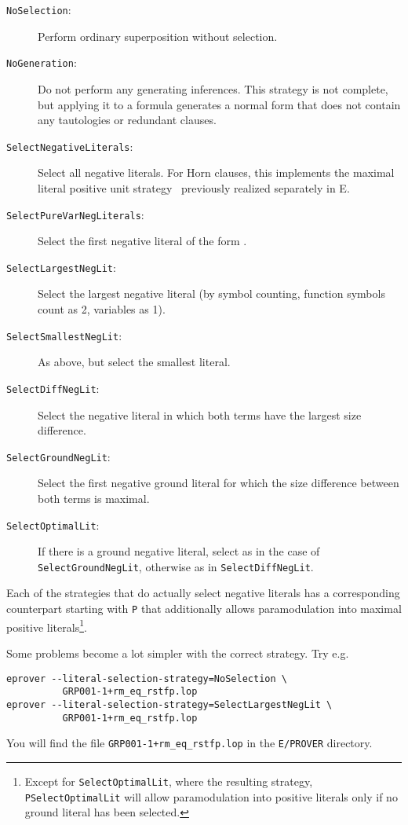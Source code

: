 \documentclass{article}
\begin{document}
\begin{description}
\item[\texttt{NoSelection}:]
 Perform ordinary superposition without selection.
\item[\texttt{NoGeneration}:] Do not perform any generating
  inferences. This strategy is not complete, but applying it to a
  formula generates a normal form that does not contain any
  tautologies or redundant clauses.
\item[\texttt{SelectNegativeLiterals}:] Select all negative literals. For Horn
  clauses, this implements the maximal literal positive unit
  strategy~\cite{Dershowitz:IJCAI-91} previously realized separately in
  E.
\item[\texttt{SelectPureVarNegLiterals}:] Select the first negative literal of
  the form .
\item[\texttt{SelectLargestNegLit}:] Select the largest negative literal (by
  symbol counting, function symbols count as 2, variables as 1).
\item[\texttt{SelectSmallestNegLit}:] As above, but select the smallest
  literal.
\item[\texttt{SelectDiffNegLit}:] Select the negative literal in which both
  terms have the largest size difference.
\item[\texttt{SelectGroundNegLit}:] Select the first negative ground literal
  for which the size difference between both terms is maximal.
\item[\texttt{SelectOptimalLit}:] If there is a ground negative literal, select
  as in the case of \texttt{SelectGroundNegLit}, otherwise as in
  \texttt{SelectDiffNegLit}.
\end{description}

Each of the strategies that do actually select negative literals has a
corresponding counterpart starting with \texttt{P} that additionally
allows paramodulation into maximal positive literals\footnote{Except
  for \texttt{SelectOptimalLit}, where the resulting strategy,
  \texttt{PSelectOptimalLit} will allow paramodulation into positive
  literals only if no ground literal has been selected.}.


\begin{example}
  Some problems become a lot simpler with the correct
  strategy. Try e.g.
\begin{verbatim}
eprover --literal-selection-strategy=NoSelection \
          GRP001-1+rm_eq_rstfp.lop
eprover --literal-selection-strategy=SelectLargestNegLit \
          GRP001-1+rm_eq_rstfp.lop
\end{verbatim}
  You will find the file \texttt{GRP001-1+rm\_eq\_rstfp.lop} in the
  \texttt{E/PROVER} directory.
\end{example}
\end{document}
